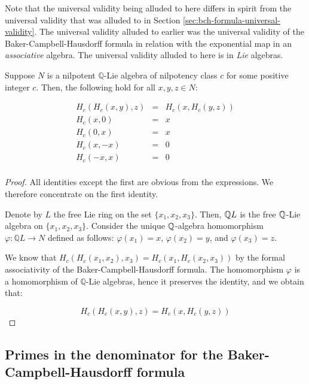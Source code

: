 Note that the universal validity being alluded to here differs in
spirit from the universal validity that was alluded to in Section
\ref{sec:bch-formula-universal-validity}. The universal validity
alluded to earlier was the universal validity of the
Baker-Campbell-Hausdorff formula in relation with the exponential map
in an {\em associative} algebra. The universal validity alluded to
here is in {\em Lie} algebras.

\begin{theorem}\label{thm:bch-group-axiom-universal-validity}
  Suppose $N$ is a nilpotent $\mathbb{Q}$-Lie algebra of
  nilpotency class $c$ for some positive integer $c$. Then, the
  following hold for all $x,y,z \in N$:
    
  \begin{eqnarray*}
    H_c(H_c(x,y),z) & = & H_c(x,H_c(y,z)) \\
    H_c(x,0) & = & x \\
    H_c(0,x) & = & x \\
    H_c(x,-x) & = & 0 \\
    H_c(-x,x) & = & 0 \\
  \end{eqnarray*}
\end{theorem}

\begin{proof}
  All identities except the first are obvious from the expressions. We
  therefore concentrate on the first identity.

  Denote by $L$ the free Lie ring on the set $\{x_1,x_2,x_3\}$. Then,
  $\mathbb{Q} L$ is the free $\mathbb{Q}$-Lie algebra on $\{x_1,x_2,x_3\}$. Consider
  the unique $\mathbb{Q}$-algebra homomorphism $\varphi: \mathbb{Q}L \to N$
  defined as follows: $\varphi(x_1) = x$, $\varphi(x_2) = y$, and
  $\varphi(x_3) = z$. 

  We know that $H_c(H_c(x_1,x_2),x_3) = H_c(x_1,H_c(x_2,x_3))$ by the
  formal associativity of the Baker-Campbell-Hausdorff formula. The
  homomorphism $\varphi$ is a homomorphism of $\mathbb{Q}$-Lie
  algebras, hence it preserves the identity, and we obtain that:

  $$H_c(H_c(x,y),z) = H_c(x,H_c(y,z))$$

\end{proof}

\subsection{Primes in the denominator for the Baker-Campbell-Hausdorff formula}\label{sec:bch-primes-in-denominators}

